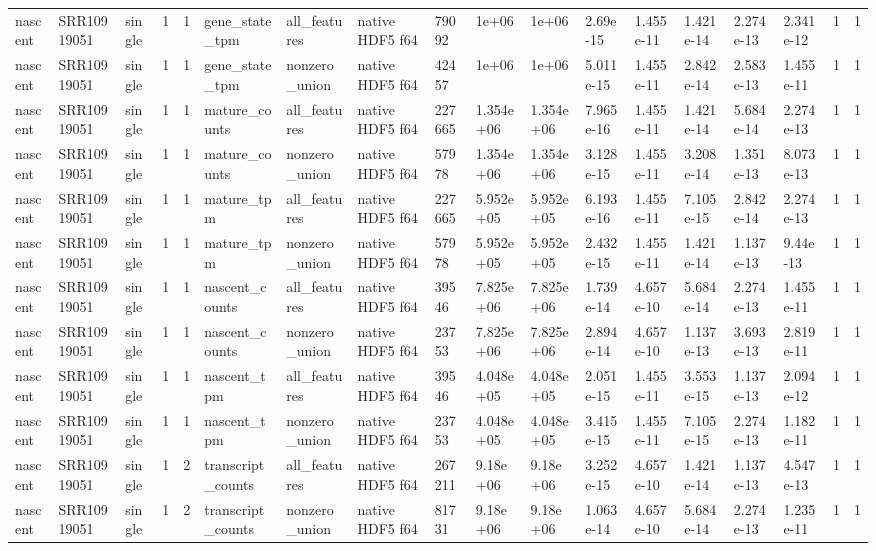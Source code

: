 \begin{tabular}{llllllllllllllllll}
nascent & SRR10919051 & single & 1 & 1 & gene\_state\_tpm & all\_features & native HDF5 f64 & 79092 & 1e+06 & 1e+06 & 2.69e-15 & 1.455e-11 & 1.421e-14 & 2.274e-13 & 2.341e-12 & 1 & 1 \\
nascent & SRR10919051 & single & 1 & 1 & gene\_state\_tpm & nonzero\_union & native HDF5 f64 & 42457 & 1e+06 & 1e+06 & 5.011e-15 & 1.455e-11 & 2.842e-14 & 2.583e-13 & 1.455e-11 & 1 & 1 \\
nascent & SRR10919051 & single & 1 & 1 & mature\_counts & all\_features & native HDF5 f64 & 227665 & 1.354e+06 & 1.354e+06 & 7.965e-16 & 1.455e-11 & 1.421e-14 & 5.684e-14 & 2.274e-13 & 1 & 1 \\
nascent & SRR10919051 & single & 1 & 1 & mature\_counts & nonzero\_union & native HDF5 f64 & 57978 & 1.354e+06 & 1.354e+06 & 3.128e-15 & 1.455e-11 & 3.208e-14 & 1.351e-13 & 8.073e-13 & 1 & 1 \\
nascent & SRR10919051 & single & 1 & 1 & mature\_tpm & all\_features & native HDF5 f64 & 227665 & 5.952e+05 & 5.952e+05 & 6.193e-16 & 1.455e-11 & 7.105e-15 & 2.842e-14 & 2.274e-13 & 1 & 1 \\
nascent & SRR10919051 & single & 1 & 1 & mature\_tpm & nonzero\_union & native HDF5 f64 & 57978 & 5.952e+05 & 5.952e+05 & 2.432e-15 & 1.455e-11 & 1.421e-14 & 1.137e-13 & 9.44e-13 & 1 & 1 \\
nascent & SRR10919051 & single & 1 & 1 & nascent\_counts & all\_features & native HDF5 f64 & 39546 & 7.825e+06 & 7.825e+06 & 1.739e-14 & 4.657e-10 & 5.684e-14 & 2.274e-13 & 1.455e-11 & 1 & 1 \\
nascent & SRR10919051 & single & 1 & 1 & nascent\_counts & nonzero\_union & native HDF5 f64 & 23753 & 7.825e+06 & 7.825e+06 & 2.894e-14 & 4.657e-10 & 1.137e-13 & 3.693e-13 & 2.819e-11 & 1 & 1 \\
nascent & SRR10919051 & single & 1 & 1 & nascent\_tpm & all\_features & native HDF5 f64 & 39546 & 4.048e+05 & 4.048e+05 & 2.051e-15 & 1.455e-11 & 3.553e-15 & 1.137e-13 & 2.094e-12 & 1 & 1 \\
nascent & SRR10919051 & single & 1 & 1 & nascent\_tpm & nonzero\_union & native HDF5 f64 & 23753 & 4.048e+05 & 4.048e+05 & 3.415e-15 & 1.455e-11 & 7.105e-15 & 2.274e-13 & 1.182e-11 & 1 & 1 \\
nascent & SRR10919051 & single & 1 & 2 & transcript\_counts & all\_features & native HDF5 f64 & 267211 & 9.18e+06 & 9.18e+06 & 3.252e-15 & 4.657e-10 & 1.421e-14 & 1.137e-13 & 4.547e-13 & 1 & 1 \\
nascent & SRR10919051 & single & 1 & 2 & transcript\_counts & nonzero\_union & native HDF5 f64 & 81731 & 9.18e+06 & 9.18e+06 & 1.063e-14 & 4.657e-10 & 5.684e-14 & 2.274e-13 & 1.235e-11 & 1 & 1 \\

\end{tabular}
